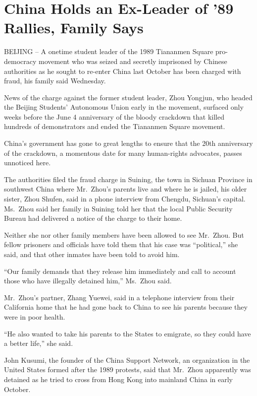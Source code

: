 \documentclass[12pt,a4paper,onecolumn]{article}
\begin{document}
\section{China Holds an Ex-Leader of '89 Rallies, Family Says}

BEIJING -- A onetime student leader of the 1989 Tiananmen Square pro-democracy movement who was
seized and secretly imprisoned by Chinese authorities as he sought to re-enter China last October
has been charged with fraud, his family said Wednesday.

News of the charge against the former student leader, Zhou Yongjun, who headed the Beijing Students'
Autonomous Union early in the movement, surfaced only weeks before the June 4 anniversary of the
bloody crackdown that killed hundreds of demonstrators and ended the Tiananmen Square movement.

China's government has gone to great lengths to ensure that the 20th anniversary of the crackdown, a
momentous date for many human-rights advocates, passes unnoticed here.

The authorities filed the fraud charge in Suining, the town in Sichuan Province in southwest China
where Mr.~Zhou's parents live and where he is jailed, his older sister, Zhou Shufen, said in a phone
interview from Chengdu, Sichuan's capital. Ms.~Zhou said her family in Suining told her that the
local Public Security Bureau had delivered a notice of the charge to their home.

Neither she nor other family members have been allowed to see Mr.~Zhou. But fellow prisoners and
officials have told them that his case was ``political,'' she said, and that other inmates have been
told to avoid him.

``Our family demands that they release him immediately and call to account those who have illegally
detained him,'' Ms.~Zhou said.

Mr.~Zhou's partner, Zhang Yuewei, said in a telephone interview from their California home that he
had gone back to China to see his parents because they were in poor health.

``He also wanted to take his parents to the States to emigrate, so they could have a better life,''
she said.

John Kusumi, the founder of the China Support Network, an organization in the United States formed
after the 1989 protests, said that Mr.~Zhou apparently was detained as he tried to cross from Hong
Kong into mainland China in early October.
\end{document}
